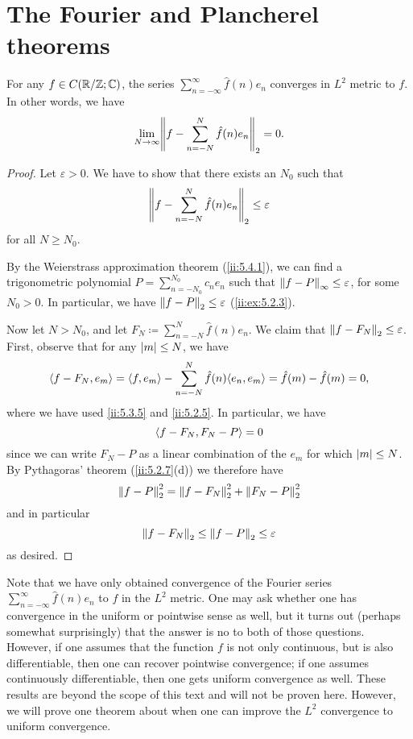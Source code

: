 \section{The Fourier and Plancherel theorems}\label{ii:sec:5.5}

\begin{thm}\label{ii:5.5.1}
  For any \(f \in C(\R / \Z ; \C)\), the series \(\sum_{n = -\infty}^\infty \hat{f}(n) e_n\) converges in \(L^2\) metric to \(f\).
  In other words, we have
  \[
    \lim_{N \to \infty} \norm*{f - \sum_{n = -N}^N \hat{f}(n) e_n}_2 = 0.
  \]
\end{thm}

\begin{proof}
  Let \(\varepsilon > 0\).
  We have to show that there exists an \(N_0\) such that
  \[
    \norm*{f - \sum_{n = -N}^N \hat{f}(n) e_n}_2 \leq \varepsilon
  \]
  for all \(N \geq N_0\).

  By the Weierstrass approximation theorem (\cref{ii:5.4.1}), we can find a trigonometric polynomial \(P = \sum_{n = -N_0}^{N_0} c_n e_n\) such that \(\norm*{f - P}_{\infty} \leq \varepsilon\), for some \(N_0 > 0\).
  In particular, we have \(\norm*{f - P}_2 \leq \varepsilon\) (\cref{ii:ex:5.2.3}).

  Now let \(N > N_0\), and let \(F_N \coloneqq \sum_{n = -N}^N \hat{f}(n) e_n\).
  We claim that \(\norm*{f - F_N}_2 \leq \varepsilon\).
  First, observe that for any \(\abs{m} \leq N\), we have
  \[
    \inner*{f - F_N, e_m} = \inner*{f, e_m} - \sum_{n = -N}^N \hat{f}(n) \inner*{e_n, e_m} = \hat{f}(m) - \hat{f}(m) = 0,
  \]
  where we have used \cref{ii:5.3.5} and \cref{ii:5.2.5}.
  In particular, we have
  \[
    \inner*{f - F_N, F_N - P} = 0
  \]
  since we can write \(F_N - P\) as a linear combination of the \(e_m\) for which \(\abs{m} \leq N\).
  By Pythagoras' theorem (\cref{ii:5.2.7}(d)) we therefore have
  \[
    \norm*{f - P}_2^2 = \norm*{f - F_N}_2^2 + \norm*{F_N - P}_2^2
  \]
  and in particular
  \[
    \norm*{f - F_N}_2 \leq \norm*{f - P}_2 \leq \varepsilon
  \]
  as desired.
\end{proof}

\begin{rmk}\label{ii:5.5.2}
  Note that we have only obtained convergence of the Fourier series \(\sum_{n = -\infty}^\infty \hat{f}(n) e_n\) to \(f\) in the \(L^2\) metric.
  One may ask whether one has convergence in the uniform or pointwise sense as well, but it turns out (perhaps somewhat surprisingly) that the answer is no to both of those questions.
  However, if one assumes that the function \(f\) is not only continuous, but is also differentiable, then one can recover pointwise convergence;
  if one assumes continuously differentiable, then one gets uniform convergence as well.
  These results are beyond the scope of this text and will not be proven here.
  However, we will prove one theorem about when one can improve the \(L^2\) convergence to uniform convergence.
\end{rmk}

